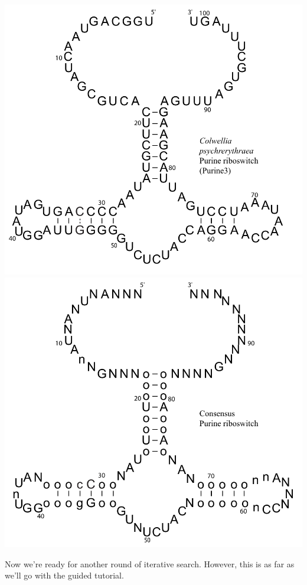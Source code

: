 \includegraphics[scale=0.5]{Figures/purine3_full}
\includegraphics[scale=0.5]{Figures/purineC_full}

Now we're ready for another round of iterative search. However, this
is as far as we'll go with the guided tutorial. 


